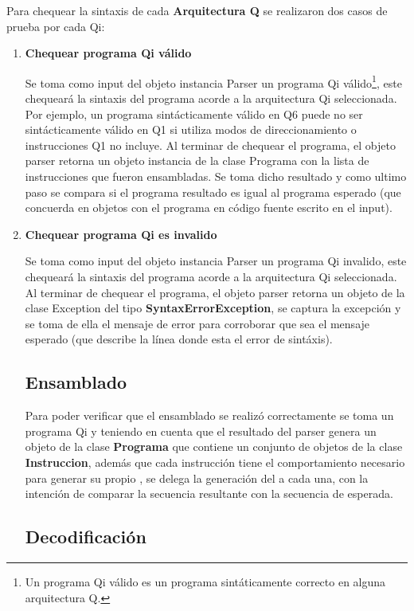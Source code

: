 Para chequear la sintaxis de cada \textbf{Arquitectura Q} se realizaron dos casos de prueba por cada Qi:
\begin{enumerate}
\item \textbf{Chequear programa Qi válido}

Se toma como input del objeto instancia Parser un programa Qi válido\footnote{Un programa Qi válido es un programa sintáticamente correcto en alguna arquitectura Q.}, este chequeará la sintaxis del programa acorde a la arquitectura Qi seleccionada. Por ejemplo, un programa sintácticamente válido en Q6 puede no ser sintácticamente válido en Q1 si utiliza modos de direccionamiento o instrucciones Q1 no incluye. Al terminar de chequear el programa, el objeto parser retorna un objeto instancia de la clase Programa con la lista de instrucciones que fueron ensambladas. 
Se toma dicho resultado y como ultimo paso se compara si el programa resultado es igual al programa esperado (que concuerda en objetos con el programa en código fuente escrito en el input).


\item \textbf{Chequear programa Qi es invalido} 

Se toma como input del objeto instancia Parser un programa Qi invalido, este chequeará la sintaxis del programa acorde a la arquitectura Qi seleccionada. Al terminar de chequear el programa, el objeto parser retorna un objeto de la clase Exception del tipo \textbf{SyntaxErrorException}, se captura la excepción y se toma de ella el mensaje de error para corroborar que sea el mensaje esperado (que describe la línea donde esta el error de sintáxis).


\subsection{Ensamblado}

Para poder verificar que el ensamblado se realizó correctamente se toma un programa Qi y teniendo en cuenta que el resultado del parser genera un objeto de la clase \textbf{Programa} que contiene un conjunto de objetos de la clase \textbf{Instruccion}, además que cada instrucción tiene el comportamiento necesario para generar su propio \codmaq, se delega la generación del \codmaq a cada una, con la intención de comparar la secuencia resultante con la secuencia de \codmaq esperada.

\subsection{Decodificación}


\end{enumerate}
